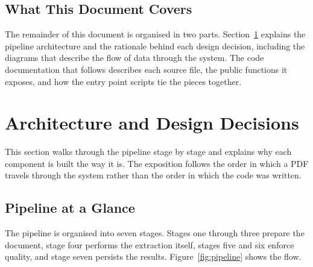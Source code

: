 \documentclass{article}
\begin{document}
\subsection{What This Document Covers}

The remainder of this document is organised in two parts.
Section~\ref{sec:architecture} explains the pipeline architecture and
the rationale behind each design decision, including the diagrams that
describe the flow of data through the system. The code documentation
that follows describes each source file, the public functions it
exposes, and how the entry point scripts tie the pieces together.

\section{Architecture and Design Decisions}
\label{sec:architecture}

This section walks through the pipeline stage by stage and explains
why each component is built the way it is. The exposition follows the
order in which a PDF travels through the system rather than the order
in which the code was written.

\subsection{Pipeline at a Glance}

The pipeline is organised into seven stages. Stages one through three
prepare the document, stage four performs the extraction itself, stages
five and six enforce quality, and stage seven persists the results.
Figure~\ref{fig:pipeline} shows the flow.
\end{document}
